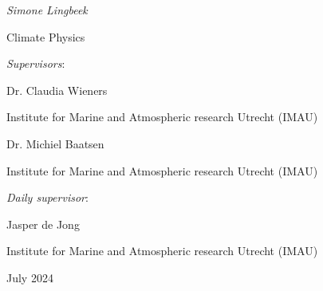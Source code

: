 \begin{titlepage}
	\vspace{0.5cm} %
	{\Large\itshape Simone Lingbeek\par}
    {\large Climate Physics\par}
    \vspace{6cm}
    \raggedleft
	{\Large\itshape Supervisors}:\par\vspace{0.25cm}
	{\large Dr. Claudia Wieners\par} %
    Institute for Marine and Atmospheric research Utrecht (IMAU)\par %
    \vspace{0.25cm}
    {\large Dr. Michiel Baatsen\par} %
    Institute for Marine and Atmospheric research Utrecht (IMAU)\par %
    \vspace{0.5cm}
	{\Large\itshape Daily supervisor}:\par\vspace{0.25cm}
    {\large Jasper de Jong\par} %
    Institute for Marine and Atmospheric research Utrecht (IMAU) %

	\vfill
	{\large July 2024 \par}%
    
\end{titlepage}    

\restoregeometry %
